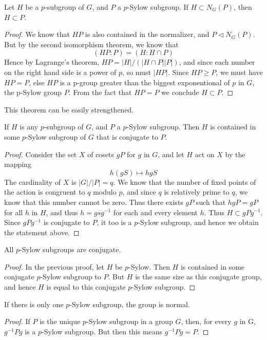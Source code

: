 \begin{lemma}
    Let $H$ be a $p$-subgroup of $G$, and $P$ a $p$-Sylow subgroup. If $H \subset N_G(P)$, then $H \subset P$.
\end{lemma}
\begin{proof}
    We know that $HP$ is also contained in the normalizer, and $P \lhd N_G(P)$. But by the second isomorphism theorem, we know that
    \[ (HP: P) = (H: H \cap P) \]
    Hence by Lagrange's theorem, $HP = |H|/(|H \cap P||P|)$, and since each number on the right hand side is a power of $p$, so must $|HP|$. Since $HP \geq P$, we must have $HP = P$, else $HP$ is a p-group greater than the biggest exponentional of $p$ in $G$, the p-Sylow group $P$. From the fact that $HP = P$ we conclude $H \subset P$.
\end{proof}

This theorem can be easily strengthened.

\begin{theorem}
    If $H$ is any $p$-subgroup of $G$, and $P$ a $p$-Sylow subgroup. Then $H$ is contained in some $p$-Sylow subgroup of $G$ that is conjugate to $P$.
\end{theorem}
\begin{proof}
    Consider the set $X$ of cosets $gP$ for $g$ in $G$, and let $H$ act on $X$ by the mapping
    \[ h(gS) \mapsto hgS \]
    The cardinality of $X$ is $|G|/|P| = q$. We know that the number of fixed points of the action is congruent to $q$ modulo $p$, and since $q$ is relatively prime to $q$, we know that this number cannot be zero. Thus there exists $gP$ such that $hgP = gP$ for all $h$ in $H$, and thus $h = gsg^{-1}$ for each and every element $h$. Thus $H \subset gPg^{-1}$. Since $gPg^{-1}$ is conjugate to $P$, it too is a $p$-Sylow subgroup, and hence we obtain the statement above.
\end{proof}

\begin{corollary}
    All $p$-Sylow subgroups are conjugate.
\end{corollary}
\begin{proof}
    In the previous proof, let $H$ be $p$-Sylow. Then $H$ is contained in some conjugate $p$-Sylow subgroup to $P$. But $H$ is the same size as this conjugate group, and hence $H$ is equal to this conjugate $p$-Sylow subgroup.
\end{proof}

\begin{corollary}
    If there is only one $p$-Sylow subgroup, the group is normal.
\end{corollary}
\begin{proof}
    If $P$ is the unique $p$-Sylow subgroup in a group $G$, then, for every $g$ in G, $g^{-1}Pg$ is a $p$-Sylow subgroup. But then this means $g^{-1}Pg = P$.
\end{proof}

